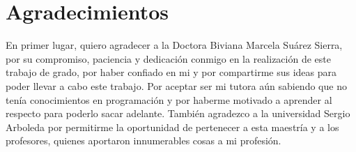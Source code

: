 \chapter*{Agradecimientos}

En primer lugar, quiero agradecer a la Doctora Biviana Marcela Suárez Sierra, por su compromiso, paciencia y dedicación conmigo en la realización de este trabajo de grado, por haber confiado en mi y por compartirme sus ideas para poder llevar a cabo este trabajo. Por aceptar ser mi tutora aún sabiendo que no tenía conocimientos en programación y por haberme motivado a aprender al respecto para poderlo sacar adelante. 
También agradezco a la universidad Sergio Arboleda por permitirme la oportunidad de pertenecer a esta maestría y a los profesores, quienes aportaron innumerables cosas a mi profesión. 
